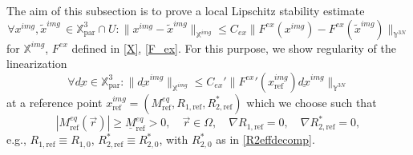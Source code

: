 \documentclass{ws-m3as}
\newcommand{\uld}[1]{\underline{d#1}}
\newcommand\Xpar{\mathbb{X}_{\text{par}}}
\begin{document}
The aim of this subsection is to prove a local Lipschitz stability estimate
\begin{equation}\label{stab_ex}
\forall x^{img},\tilde{x}^{img}\, \in \Xpar^3\cap U:
\|x^{img}-\tilde{x}^{img}\|_{\mathbb{X}^{img}}\leq C_{ex}
\|F^{ex}(x^{img})-F^{ex}(\tilde{x}^{img})\|_{\mathbb{Y}^{3N}}
\end{equation}
for $\mathbb{X}^{img}$, $F^{ex}$ defined in \eqref{X}, \eqref{F_ex}.
For this purpose, we show regularity of the linearization 
\begin{equation}\label{stab_ex_lin}
\forall  \uld{x}\in \Xpar^3:
\|\uld{x}^{img}\|_{\mathbb{X}^{img}}\leq C_{ex}'
\|{F^{ex}}'(x^{img}_{\text{ref}})\uld{x}^{img}\|_{\mathbb{Y}^{3N}} 
\end{equation}
at a reference point 
$x^{img}_{\text{ref}}=(M^{eq}_{\text{ref}},R_{1,\text{ref}},R_{2,\text{ref}}^*)$ which we choose such that 
\begin{equation}\label{MrefR1refR2ref}
|M^{eq}_{\text{ref}}(\vec r)|\geq \underline{M}^{eq}_{\text{ref}}>0, \quad {\vec r}\in\Omega, 
\quad \nabla R_{1,\text{ref}}=0, \quad \nabla R_{2,\text{ref}}^*=0,
\end{equation}
e.g., $R_{1,\text{ref}}\equiv R_{1,0}$, $R_{2,\text{ref}}^*\equiv R_{2,0}^*$, with $R_{2,0}^*$ as in \eqref{R2effdecomp}.
\end{document}
